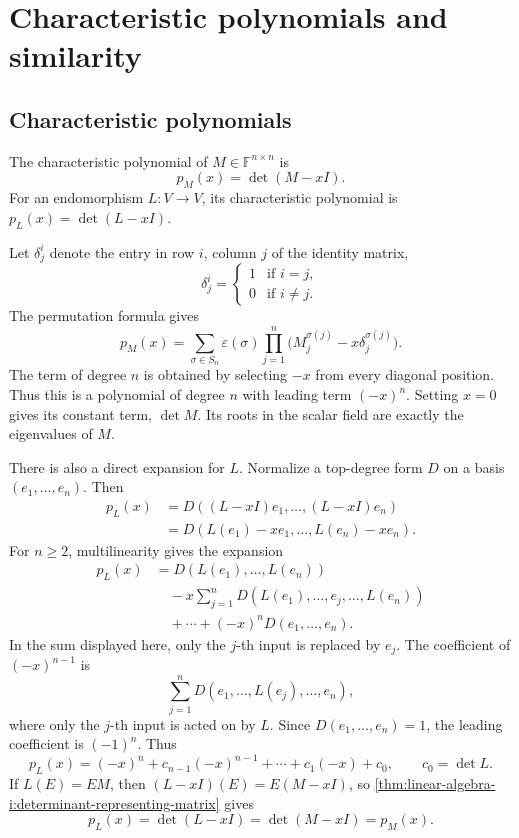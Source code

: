 \section{Characteristic polynomials and similarity}
\label{sec:linear-algebra-i:characteristic-polynomials-and-similarity}

\subsection{Characteristic polynomials}

\begin{definition}
  The characteristic polynomial of \(M\in\mathbb F^{n\times n}\) is
  \[
    p_M(x)=\det(M-xI).
  \]
  For an endomorphism \(L:V\to V\), its characteristic polynomial is
  \(p_L(x)=\det(L-xI)\).
\end{definition}

Let \(\delta^i_j\) denote the entry in row \(i\), column \(j\) of
the identity matrix,
\[
  \delta^i_j=\begin{cases}1&\text{if }i=j,\\0&\text{if }i\ne j.\end{cases}
\]
The permutation formula gives
\[
  p_M(x)=\sum_{\sigma\in S_n}\varepsilon(\sigma)
    \prod_{j=1}^n\bigl(M^{\sigma(j)}_j-x\delta^{\sigma(j)}_j\bigr).
\]
The term of degree \(n\) is obtained by selecting \(-x\) from every
diagonal position. Thus this is a polynomial of degree \(n\) with
leading term \((-x)^n\). Setting \(x=0\) gives its constant term,
\(\det M\). Its roots in the scalar field
are exactly the eigenvalues of \(M\).

There is also a direct expansion for \(L\). Normalize a top-degree form
\(D\) on a basis \((e_1,\ldots,e_n)\). Then
\begin{align*}
  p_L(x)
    &=D((L-xI)e_1,\ldots,(L-xI)e_n)\\
    &=D(L(e_1)-xe_1,\ldots,L(e_n)-xe_n).
\end{align*}
For \(n\ge2\), multilinearity gives the expansion
\[
  \begin{aligned}
    p_L(x)&=D(L(e_1),\ldots,L(e_n))\\
      &\quad-x\sum_{j=1}^n
        D(L(e_1),\ldots,e_j,\ldots,L(e_n))\\
      &\quad+\cdots+(-x)^nD(e_1,\ldots,e_n).
  \end{aligned}
\]
In the sum displayed here, only the \(j\)-th input is replaced by
\(e_j\). The coefficient of \((-x)^{n-1}\) is
\[
  \sum_{j=1}^n D(e_1,\ldots,L(e_j),\ldots,e_n),
\]
where only the \(j\)-th input is acted on by \(L\).
Since \(D(e_1,\ldots,e_n)=1\), the leading coefficient is \((-1)^n\).
Thus
\[
  p_L(x)=(-x)^n+c_{n-1}(-x)^{n-1}+\cdots+c_1(-x)+c_0,
  \qquad c_0=\det L.
\]
If \(L(E)=EM\), then \((L-xI)(E)=E(M-xI)\), so
\autoref{thm:linear-algebra-i:determinant-representing-matrix} gives
\[
  p_L(x)=\det(L-xI)=\det(M-xI)=p_M(x).
\]


